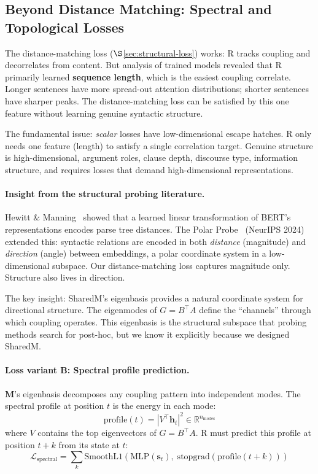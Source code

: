 \documentclass[11pt, a4paper]{article}
\newcommand{\M}{\mathbf{M}}
\newcommand{\h}{\mathbf{h}}
\newcommand{\R}{\mathbb{R}}
\theoremstyle{plain}
\theoremstyle{definition}
\theoremstyle{remark}
\begin{document}
\subsection{Beyond Distance Matching: Spectral and Topological Losses}
\label{sec:spectral-losses}

The distance-matching loss ($\S$\ref{sec:structural-loss}) works: R tracks coupling and decorrelates from content.
But analysis of trained models revealed that R primarily learned \textbf{sequence length}, which is the easiest coupling correlate.
Longer sentences have more spread-out attention distributions; shorter sentences have sharper peaks.
The distance-matching loss can be satisfied by this one feature without learning genuine syntactic structure.

The fundamental issue: \emph{scalar} losses have low-dimensional escape hatches.
R only needs one feature (length) to satisfy a single correlation target.
Genuine structure is high-dimensional, argument roles, clause depth, discourse type, information structure, and requires losses that demand high-dimensional representations.

\paragraph{Insight from the structural probing literature.}
Hewitt \& Manning~\cite{hewitt2019structural} showed that a learned linear transformation of BERT's representations encodes parse tree distances.
The Polar Probe~\cite{chen2024polar} (NeurIPS 2024) extended this: syntactic relations are encoded in both \emph{distance} (magnitude) and \emph{direction} (angle) between embeddings, a polar coordinate system in a low-dimensional subspace.
Our distance-matching loss captures magnitude only.
Structure also lives in direction.

The key insight: SharedM's eigenbasis provides a natural coordinate system for directional structure.
The eigenmodes of $G = B^\top A$ define the ``channels'' through which coupling operates.
This eigenbasis is the structural subspace that probing methods search for post-hoc, but we know it explicitly because we designed SharedM.

\paragraph{Loss variant B: Spectral profile prediction.}
$\M$'s eigenbasis decomposes any coupling pattern into independent modes.
The spectral profile at position $t$ is the energy in each mode:
\begin{equation}
\mathrm{profile}(t) = |V^\top \h_t|^2 \in \R^{n_{\mathrm{modes}}}
\end{equation}
where $V$ contains the top eigenvectors of $G = B^\top A$.
R must predict this profile at position $t + k$ from its state at $t$:
\begin{equation}
\mathcal{L}_{\mathrm{spectral}} = \sum_k \mathrm{SmoothL1}\!\left(\mathrm{MLP}(\mathbf{s}_t),\; \mathrm{stopgrad}\!\left(\mathrm{profile}(t+k)\right)\right)
\end{equation}
\end{document}

